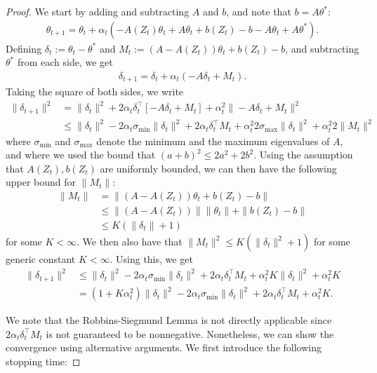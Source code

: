 \documentclass[11pt]{article}
\begin{document}
\begin{proof}
We start by adding and subtracting $A$ and $b$, and note that $b=A\theta^*$:
\begin{align*}
\theta_{t+1}=\theta_t + \alpha_t\left(-A(Z_t)\theta_t + A\theta_t    +b(Z_t)-b - A\theta_t + A\theta^* \right).
\end{align*}
Defining $\delta_t:=\theta_t-\theta^*$ and $M_t:= (A-A(Z_t))\theta_t + b(Z_t)-b$, and subtracting $\theta^*$ from each side, we get
\begin{align*}
\delta_{t+1}=\delta_t + \alpha_t\left(-A \delta_t + M_t\right).
\end{align*}
Taking the square of both sides, we write
\begin{align}\label{random_bnd}
\|\delta_{t+1}\|^2& =\|\delta_t\|^2 + 2\alpha_t\delta^\intercal_t\left[-A\delta_t+M_t\right]+\alpha^2_t \|-A\delta_t + M_t\|^2\nonumber\\
&\leq\|\delta_t\|^2 -2\alpha_t \sigma_{\min}\|\delta_t\|^2 + 2\alpha_t \delta^\intercal_t M_t + \alpha_t^2 2\sigma_{\max}\|\delta_t\|^2 + \alpha_t^2 2\|M_t\|^2
\end{align}
where $\sigma_{\min}$ and $\sigma_{\max}$ denote the minimum and the maximum eigenvalues of $A$, and where we used the bound that $(a+b)^2\leq 2a^2+2b^2$. Using the assumption that $A(Z_t),b(Z_t)$ are uniformly bounded, we can then have the following upper bound for $\|M_t\|$:
\begin{align*}
\|M_t\|&= \|(A-A(Z_t))\theta_t + b(Z_t)-b\|\\
& \leq  \|(A-A(Z_t))\| \|\theta_t\| + \|b(Z_t)-b\|\\
&\leq K (\|\delta_t\| + 1)
\end{align*}
for some $K<\infty$. We then also have that $\|M_t\|^2 \leq K(\|\delta_t\|^2+1)$ for some generic constant $K<\infty$. Using this, we get
\begin{align}\label{robbin_bound}
\|\delta_{t+1}\|^2 &\leq \|\delta_t\|^2 -2\alpha_t \sigma_{\min}\|\delta_t\|^2 + 2\alpha_t \delta^\intercal_t M_t + \alpha_t^2 K \|\delta_t\|^2 + \alpha_t^2 K\nonumber\\
&=(1+K\alpha_t^2)\|\delta_t\|^2 - 2\alpha_t \sigma_{\min}\|\delta_t\|^2 + 2\alpha_t \delta^\intercal_t M_t + \alpha_t^2 K.
\end{align}

We note that the  Robbins-Siegmund Lemma is not directly applicable since $2\alpha_t \delta^\intercal_t M_t $ is not guaranteed to be nonnegative. Nonetheless, we can show the convergence using alternative arguments. We first introduce the following stopping time:


\end{proof}
\end{document}
